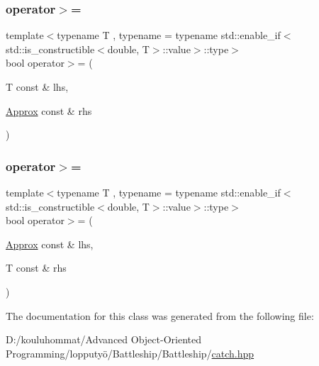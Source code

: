 \subsubsection{\texorpdfstring{operator$>$=}{operator>=}\hspace{0.1cm}{\footnotesize\ttfamily [1/2]}}
{\footnotesize\ttfamily template$<$typename T , typename  = typename std\+::enable\+\_\+if$<$std\+::is\+\_\+constructible$<$double, T$>$\+::value$>$\+::type$>$ \\
bool operator$>$= (\begin{DoxyParamCaption}\item[{T const \&}]{lhs,  }\item[{\mbox{\hyperlink{class_catch_1_1_detail_1_1_approx}{Approx}} const \&}]{rhs }\end{DoxyParamCaption})\hspace{0.3cm}{\ttfamily [friend]}}

\mbox{\label{class_catch_1_1_detail_1_1_approx_a5899b8a36725406701e2ebded2971ee6}} 
\subsubsection{\texorpdfstring{operator$>$=}{operator>=}\hspace{0.1cm}{\footnotesize\ttfamily [2/2]}}
{\footnotesize\ttfamily template$<$typename T , typename  = typename std\+::enable\+\_\+if$<$std\+::is\+\_\+constructible$<$double, T$>$\+::value$>$\+::type$>$ \\
bool operator$>$= (\begin{DoxyParamCaption}\item[{\mbox{\hyperlink{class_catch_1_1_detail_1_1_approx}{Approx}} const \&}]{lhs,  }\item[{T const \&}]{rhs }\end{DoxyParamCaption})\hspace{0.3cm}{\ttfamily [friend]}}



The documentation for this class was generated from the following file\+:\begin{DoxyCompactItemize}
\item 
D\+:/kouluhommat/\+Advanced Object-\/\+Oriented Programming/lopputyö/\+Battleship/\+Battleship/\mbox{\hyperlink{catch_8hpp}{catch.\+hpp}}\end{DoxyCompactItemize}
